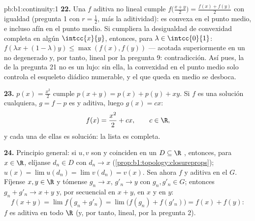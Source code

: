 \begin{solution}{pb:b1:continuity:1}
\textbf{22.} Una $f$ aditiva no lineal cumple
$f\bigl(\frac{x+y}{2}\bigr) = \frac{f(x) + f(y)}{2}$ con igualdad
(pregunta 1 con $r = \frac12$, más la aditividad): es convexa en el
punto medio, e incluso afín en el punto medio. Si cumpliera la
desigualdad de convexidad completa en algún 
$\intcc{x}{y}$, entonces, para $\lambda \in \intcc{0}{1}$:
$f(\lambda x + (1-\lambda)y) \leq \max(f(x), f(y))$ --- acotada
superiormente en un  no degenerado y, por tanto, lineal por
la pregunta 9: contradicción. Así pues, la  de la
pregunta 21 no es un lujo: sin ella, la convexidad en el punto medio
solo controla el esqueleto diádico numerable, y el  que queda
en medio se desboca.

\textbf{23.} $p(x) = \frac{x^2}{2}$ cumple
$p(x+y) = p(x) + p(y) + xy$. Si $f$ es una solución 
cualquiera, $g = f - p$ es  y aditiva, luego $g(x) = cx$:
\[
f(x) = \frac{x^2}{2} + cx , \qquad c \in \R ,
\]
y cada una de ellas es solución: la lista es completa.

\textbf{24.} Principio general: si $u, v$ son  y coinciden
en un $D \subseteq \R$ , entonces, para $x \in \R$, elíjanse
$d_n \in D$ con $d_n \to x$ (\cref{prop:b1:topology:closureprops});
$u(x) = \lim u(d_n) = \lim v(d_n) = v(x)$. Sea ahora $f$  y
aditiva en el   $G$. Fíjense $x, y \in \R$ y tómense
$g_n \to x$, $g'_n \to y$ con $g_n, g'_n \in G$; entonces
$g_n + g'_n \to x + y$ y, por  secuencial en $x + y$, en
$x$ y en $y$:
\[
f(x + y) = \lim f(g_n + g'_n) = \lim\bigl(f(g_n) +
f(g'_n)\bigr) = f(x) + f(y) :
\]
$f$ es aditiva en todo $\R$ (y, por tanto, lineal, por la pregunta 2).


\end{solution}
